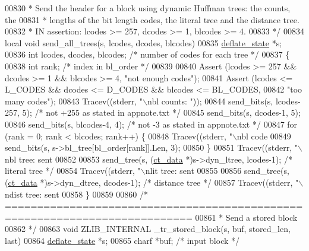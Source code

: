 \begin{DoxyCode}
{{{{{{{{{{{{{{00830 \textcolor{comment}{ * Send the header for a block using dynamic Huffman trees: the counts, the}
00831 \textcolor{comment}{ * lengths of the bit length codes, the literal tree and the distance tree.}
00832 \textcolor{comment}{ * IN assertion: lcodes >= 257, dcodes >= 1, blcodes >= 4.}
00833 \textcolor{comment}{ */}
00834 local \textcolor{keywordtype}{void} send\_all\_trees(s, lcodes, dcodes, blcodes)
00835     \hyperlink{structinternal__state}{deflate\_state} *s;
00836     \textcolor{keywordtype}{int} lcodes, dcodes, blcodes; \textcolor{comment}{/* number of codes for each tree */}
00837 \{
00838     \textcolor{keywordtype}{int} rank;                    \textcolor{comment}{/* index in bl\_order */}
00839 
00840     Assert (lcodes >= 257 && dcodes >= 1 && blcodes >= 4, \textcolor{stringliteral}{"not enough codes"});
00841     Assert (lcodes <= L\_CODES && dcodes <= D\_CODES && blcodes <= BL\_CODES,
00842             \textcolor{stringliteral}{"too many codes"});
00843     Tracev((stderr, \textcolor{stringliteral}{"\(\backslash\)nbl counts: "}));
00844     send\_bits(s, lcodes-257, 5); \textcolor{comment}{/* not +255 as stated in appnote.txt */}
00845     send\_bits(s, dcodes-1,   5);
00846     send\_bits(s, blcodes-4,  4); \textcolor{comment}{/* not -3 as stated in appnote.txt */}
00847     \textcolor{keywordflow}{for} (rank = 0; rank < blcodes; rank++) \{
00848         Tracev((stderr, \textcolor{stringliteral}{"\(\backslash\)nbl code %
00849         send\_bits(s, s->bl\_tree[bl\_order[rank]].Len, 3);
00850     \}
00851     Tracev((stderr, \textcolor{stringliteral}{"\(\backslash\)nbl tree: sent %
00852 
00853     send\_tree(s, (\hyperlink{structct__data__s}{ct\_data} *)s->dyn\_ltree, lcodes-1); \textcolor{comment}{/* literal tree */}
00854     Tracev((stderr, \textcolor{stringliteral}{"\(\backslash\)nlit tree: sent %
00855 
00856     send\_tree(s, (\hyperlink{structct__data__s}{ct\_data} *)s->dyn\_dtree, dcodes-1); \textcolor{comment}{/* distance tree */}
00857     Tracev((stderr, \textcolor{stringliteral}{"\(\backslash\)ndist tree: sent %
00858 \}
00859 
00860 \textcolor{comment}{/* ===========================================================================}
00861 \textcolor{comment}{ * Send a stored block}
00862 \textcolor{comment}{ */}
00863 \textcolor{keywordtype}{void} ZLIB\_INTERNAL \_tr\_stored\_block(s, buf, stored\_len, last)
00864     \hyperlink{structinternal__state}{deflate\_state} *s;
00865     charf *buf;       \textcolor{comment}{/* input block */}
}}}}}}}}}}}}}}}}}}
\end{DoxyCode}
